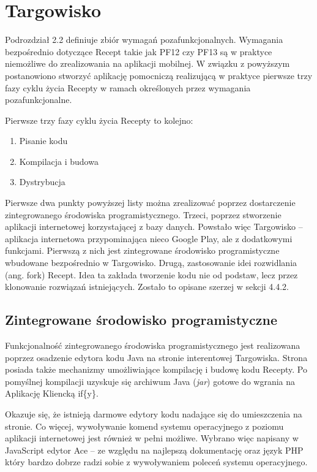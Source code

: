 \documentclass[11pt,a4paper,polish,thesis]{dcsbook}
\begin{document}
\section{Targowisko}
Podrozdział 2.2 definiuje zbiór wymagań pozafunkcjonalnych. Wymagania bezpośrednio dotyczące Recept takie jak PF12 czy PF13 są w praktyce niemożliwe do zrealizowania
na aplikacji mobilnej. W związku z powyższym postanowiono stworzyć aplikację pomocniczą realizującą w praktyce pierwsze trzy fazy cyklu życia Recepty w
ramach określonych przez wymagania pozafunkcjonalne.

Pierwsze trzy fazy cyklu życia Recepty to kolejno:
\begin{enumerate}
\item Pisanie kodu
\item Kompilacja i budowa
\item Dystrybucja
\end{enumerate}

Pierwsze dwa punkty powyższej listy można zrealizować poprzez dostarczenie zintegrowanego środowiska programistycznego. Trzeci, poprzez stworzenie aplikacji
internetowej korzystającej z bazy danych. Powstało więc Targowisko -- aplikacja internetowa przypominająca nieco Google Play, ale z dodatkowymi funkcjami.
Pierwszą z nich jest zintegrowane środowisko programistyczne wbudowane bezpośrednio w Targowisko. Drugą, zastosowanie idei rozwidlania (ang. fork) Recept. Idea ta
zakłada tworzenie kodu nie od podstaw, lecz przez klonowanie rozwiązań istniejących. Zostało to opisane szerzej w sekcji 4.4.2.

\subsection{Zintegrowane środowisko programistyczne}
Funkcjonalność zintegrowanego środowiska programistycznego jest realizowana poprzez osadzenie edytora kodu Java na stronie interentowej Targowiska. Strona posiada
także mechanizmy umożliwiające kompilację i budowę kodu Recepty. Po pomyślnej kompilacji uzyskuje się archiwum Java (\emph{jar}) gotowe do wgrania na Aplikację
Kliencką if\{y\}.

Okazuje się, że istnieją darmowe edytory kodu nadające się do umieszczenia na stronie. Co więcej, wywoływanie komend systemu operacyjnego z poziomu aplikacji
internetowej jest również w pełni możliwe. Wybrano więc napisany w JavaScript edytor Ace -- ze względu na najlepszą dokumentację oraz język PHP który bardzo dobrze
radzi sobie z wywoływaniem poleceń systemu operacyjnego.
\end{document}
